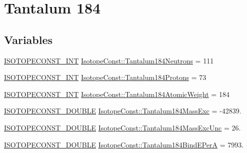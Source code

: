 \hypertarget{group___isotope_const-_tantalum-_ta184}{}\section{Tantalum 184}
\label{group___isotope_const-_tantalum-_ta184}
\subsection*{Variables}
\begin{DoxyCompactItemize}
\item 
\mbox{\hyperlink{group___isotope_const-_macros_ga5f18360b3e99483a35c32d789e62621c}{I\+S\+O\+T\+O\+P\+E\+C\+O\+N\+S\+T\+\_\+\+I\+NT}} \mbox{\hyperlink{group___isotope_const-_tantalum-_ta184_ga3a30e1bbd346075ca5eed5932dc0e684}{Isotope\+Const\+::\+Tantalum184\+Neutrons}} = 111
\item 
\mbox{\hyperlink{group___isotope_const-_macros_ga5f18360b3e99483a35c32d789e62621c}{I\+S\+O\+T\+O\+P\+E\+C\+O\+N\+S\+T\+\_\+\+I\+NT}} \mbox{\hyperlink{group___isotope_const-_tantalum-_ta184_gaf538326e41852f97080f722653cc845b}{Isotope\+Const\+::\+Tantalum184\+Protons}} = 73
\item 
\mbox{\hyperlink{group___isotope_const-_macros_ga5f18360b3e99483a35c32d789e62621c}{I\+S\+O\+T\+O\+P\+E\+C\+O\+N\+S\+T\+\_\+\+I\+NT}} \mbox{\hyperlink{group___isotope_const-_tantalum-_ta184_ga551f3f0282ddab7b687a02ed01a6d03a}{Isotope\+Const\+::\+Tantalum184\+Atomic\+Weight}} = 184
\item 
\mbox{\hyperlink{group___isotope_const-_macros_ga8f45a7272ce02c0b4c65c44636ed719a}{I\+S\+O\+T\+O\+P\+E\+C\+O\+N\+S\+T\+\_\+\+D\+O\+U\+B\+LE}} \mbox{\hyperlink{group___isotope_const-_tantalum-_ta184_gacebfcbf0376583e919c7ac9852f3d413}{Isotope\+Const\+::\+Tantalum184\+Mass\+Exc}} = -\/42839.
\item 
\mbox{\hyperlink{group___isotope_const-_macros_ga8f45a7272ce02c0b4c65c44636ed719a}{I\+S\+O\+T\+O\+P\+E\+C\+O\+N\+S\+T\+\_\+\+D\+O\+U\+B\+LE}} \mbox{\hyperlink{group___isotope_const-_tantalum-_ta184_gae1ff85e86de35df37e23a213f92d2e54}{Isotope\+Const\+::\+Tantalum184\+Mass\+Exc\+Unc}} = 26.
\item 
\mbox{\hyperlink{group___isotope_const-_macros_ga8f45a7272ce02c0b4c65c44636ed719a}{I\+S\+O\+T\+O\+P\+E\+C\+O\+N\+S\+T\+\_\+\+D\+O\+U\+B\+LE}} \mbox{\hyperlink{group___isotope_const-_tantalum-_ta184_gab2fc9608d4feee5e585f679f9946741d}{Isotope\+Const\+::\+Tantalum184\+Bind\+E\+PerA}} = 7993.
\item 

\end{DoxyCompactItemize}
